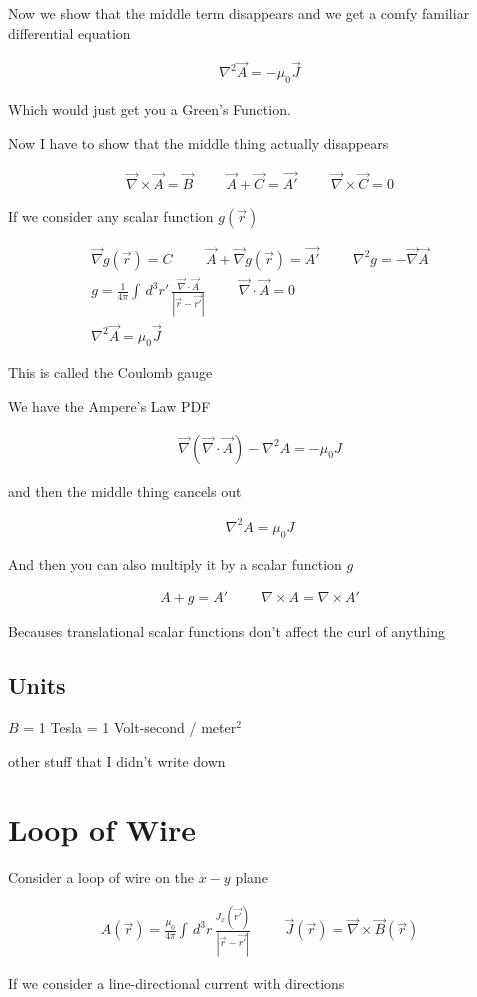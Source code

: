 \documentclass[fleqn]{report}
\newcommand{\hp}{\hspace{1cm}}
\newcommand{\equations} [1] {
\begin{gather*}
#1
\end{gather*}
}
\begin{document}
Now we show that the middle term disappears and we get a comfy 
familiar differential equation 
\equations{
    \nabla^2 \vec A = -\mu_0 \vec J 
}
Which would just get you a Green's Function. 

Now I have to show that the middle thing actually disappears 

\equations{
    \vec \nabla \times \vec A = \vec B 
    \hp 
    \vec A + \vec C = \vec{A'} 
    \hp 
    \vec \nabla \times \vec C = 0
}

If we consider any scalar function $g(\vec r)$ 

\equations{
    \vec \nabla g(\vec r) = C 
    \hp
    \vec A + \vec \nabla g(\vec r) = \vec{A'} 
    \hp 
    \nabla^2 g = - \vec \nabla \vec A 
    \\
    g 
    =
    \frac{1}{4 \pi}
    \int \, d^3 r' \, 
    \frac{\vec \nabla \cdot \vec A }{|\vec r - \vec{r'}|}
    \hp 
    \vec \nabla \cdot \vec A = 0 
    \\
    \nabla^2 \vec A = \mu_0 \vec J 
}
This is called the Coulomb gauge 

We have the Ampere's Law PDF 
\equations{
    \vec \nabla (\vec \nabla \cdot \vec A) - \nabla^2 A = -\mu_0 J
}
and then the middle thing cancels out 

\equations{
    \nabla^2 A = \mu_0 J
}

And then you can also multiply it by a scalar function $g$ 

\equations{
    A + g = A'
    \hp 
    \nabla \times A = \nabla \times A'
}
Becauses translational scalar functions don't affect the curl of anything 

\subsection{Units}
$B$ = 1 Tesla = 1 Volt-second / meter$^2$

other stuff that I didn't write down 

\section{Loop of Wire}
Consider a loop of wire on the $x-y$ plane 

\equations{
    A(\vec r)
    =
    \frac{\mu_0}{4 \pi}
    \int \, d^3 r \, 
    \frac{J_x(\vec{r'})}{|\vec r - \vec{r'}|}
    \hp 
    \vec J(\vec r)
    =
    \vec \nabla \times \vec B(\vec r)
}

If we consider a line-directional current with directions 
\end{document}
